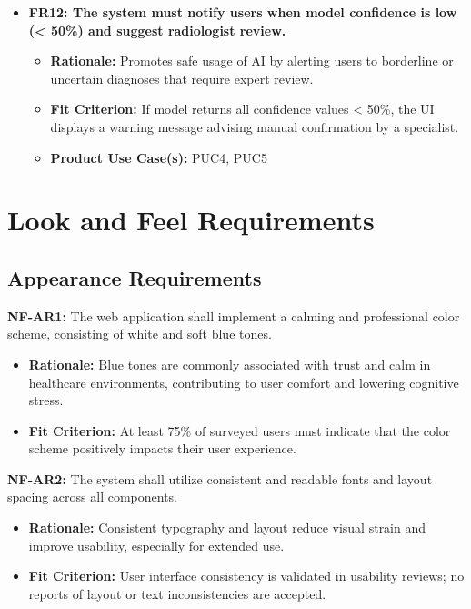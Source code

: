 \documentclass[12pt]{article}
\begin{document}
\begin{itemize}
    \item \textbf{FR12: The system must notify users when model confidence is low (< 50\%) and suggest radiologist review.}
    \begin{itemize}
        \item \textbf{Rationale:} Promotes safe usage of AI by alerting users to borderline or uncertain diagnoses that require expert review.
        \item \textbf{Fit Criterion:} If model returns all confidence values < 50\%, the UI displays a warning message advising manual confirmation by a specialist.
        \item \textbf{Product Use Case(s):} PUC4, PUC5
    \end{itemize}
\end{itemize}

\section{Look and Feel Requirements}


\subsection{Appearance Requirements}

\textbf{NF-AR1:} The web application shall implement a calming and professional color scheme, consisting of white and soft blue tones.
\begin{itemize}
    \item \textbf{Rationale:} Blue tones are commonly associated with trust and calm in healthcare environments, contributing to user comfort and lowering cognitive stress.
    \item \textbf{Fit Criterion:} At least 75\% of surveyed users must indicate that the color scheme positively impacts their user experience.
\end{itemize}

\textbf{NF-AR2:} The system shall utilize consistent and readable fonts and layout spacing across all components.
\begin{itemize}
    \item \textbf{Rationale:} Consistent typography and layout reduce visual strain and improve usability, especially for extended use.
    \item \textbf{Fit Criterion:} User interface consistency is validated in usability reviews; no reports of layout or text inconsistencies are accepted.
\end{itemize}
\end{document}
